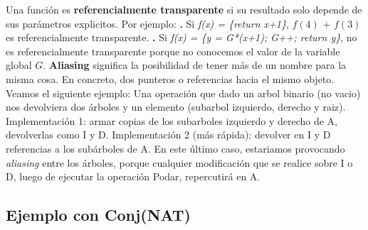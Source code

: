 \documentclass[10pt,a4paper]{article}
\begin{document}
Una función es \textbf{referencialmente transparente} si su resultado solo depende de sus parámetros explicitos.
\newline
\newline
Por ejemplo:
\newline
\newline
\textbf{.} Si \textit{f(x) = \{return x+1\}}, $f(4)$  $+$ $f(3)$ es referencialmente transparente.
\newline
\newline
\textbf{.} Si \textit{f(x) = \{y = G*(x+1); G++; return y\}}, no es referencialmente transparente porque no conocemos el valor de la variable global $G$.
\newline
\newline
\textbf{Aliasing} significa la posibilidad de tener más de un nombre para la misma cosa. En concreto, dos punteros o referencias hacia el mismo objeto.
\newline
\newline
Veamos el siguiente ejemplo:
\newline
\newline
Una operación que dado un arbol binario (no vacio) nos devolviera dos árboles y un elemento (subarbol izquierdo, derecho y raiz).
\newline
\newline
{}
\newline
\newline
Implementación 1: armar copias de los subarboles izquierdo y derecho de A, devolverlas como I y D.
\newline
\newline
Implementación 2 (más rápida): devolver en I y D referencias a los subárboles de A.
\newline
\newline
En este último caso, estariamos provocando \textit{aliasing} entre los árboles, porque cualquier modificación que se realice sobre I o D, luego de ejecutar la operación Podar, repercutirá en A.
\newpage
\subsection{Ejemplo con Conj(NAT)}
\end{document}
